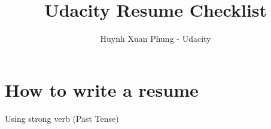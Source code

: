 \documentclass{article}
\title{Udacity Resume Checklist}
\author{Huynh Xuan Phung - Udacity}
\date{ }
\begin{document}
 
\maketitle
 
\tableofcontents

\section{How to write a resume}
Using strong verb (Past Tense)
\end{document}
